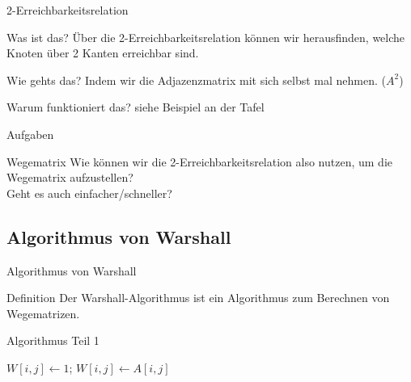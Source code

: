 	
	\begin{frame}{2-Erreichbarkeitsrelation}
		\begin{block}{Was ist das?}
			Über die 2-Erreichbarkeitsrelation können wir herausfinden, welche Knoten über 2 Kanten erreichbar sind.
		\end{block}
		
		\begin{block}{Wie gehts das?}
			Indem wir die Adjazenzmatrix mit sich selbst mal nehmen. ($A^2$)
		\end{block}
		
		\begin{block}{Warum funktioniert das?}
			siehe Beispiel an der Tafel		
		\end{block}
	\end{frame}
	
	\begin{frame}{Aufgaben}
	\end{frame}
	
	
	\begin{frame}{Wegematrix}
		Wie können wir die 2-Erreichbarkeitsrelation also nutzen, um die Wegematrix aufzustellen?\\
		\vspace{10pt}
		\pause
		Geht es auch einfacher/schneller?
	\end{frame}
	
	
	
	\subsection{Algorithmus von Warshall}
	\begin{frame}{Algorithmus von Warshall}
		\begin{block}{Definition}
			Der Warshall-Algorithmus ist ein Algorithmus zum Berechnen von Wegematrizen.
		\end{block}
		
		\begin{block}{Algorithmus Teil 1}
            \begin{algorithmic}
							\State $W[i,j] \gets 1$;
						\Else
							\State $W[i,j] \gets A[i,j]$
						\EndIf
					\EndFor
				\EndFor
            \end{algorithmic}
			
		\end{block}
	\end{frame}
	
